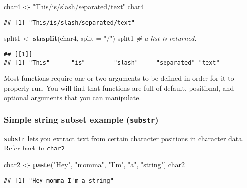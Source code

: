 \documentclass[]{article}
\newenvironment{Shaded}{\begin{snugshade}}{\end{snugshade}}
\newcommand{\KeywordTok}[1]{\textcolor[rgb]{0.13,0.29,0.53}{\textbf{#1}}}
\newcommand{\DataTypeTok}[1]{\textcolor[rgb]{0.13,0.29,0.53}{#1}}
\newcommand{\StringTok}[1]{\textcolor[rgb]{0.31,0.60,0.02}{#1}}
\newcommand{\CommentTok}[1]{\textcolor[rgb]{0.56,0.35,0.01}{\textit{#1}}}
\newcommand{\NormalTok}[1]{#1}
\begin{document}
\begin{Shaded}
\begin{Highlighting}[]
\NormalTok{char4 <-}\StringTok{ "This/is/slash/separated/text"}
\NormalTok{char4}
\end{Highlighting}
\end{Shaded}

\begin{verbatim}
## [1] "This/is/slash/separated/text"
\end{verbatim}

\begin{Shaded}
\begin{Highlighting}[]
\NormalTok{split1 <-}\StringTok{ }\KeywordTok{strsplit}\NormalTok{(char4, }\DataTypeTok{split =} \StringTok{"/"}\NormalTok{)}
\NormalTok{split1 }\CommentTok{# a list is returned. }
\end{Highlighting}
\end{Shaded}

\begin{verbatim}
## [[1]]
## [1] "This"      "is"        "slash"     "separated" "text"
\end{verbatim}

Most functions require one or two arguments to be defined in order for
it to properly run. You will find that functions are full of default,
positional, and optional arguments that you can manipulate.

\subsubsection{\texorpdfstring{Simple string subset example
(\texttt{substr})}{Simple string subset example (substr)}}\label{simple-string-subset-example-substr}

\texttt{substr} lets you extract text from certain character positions
in character data. Refer back to \texttt{char2}

\begin{Shaded}
\begin{Highlighting}[]
\NormalTok{char2 <-}\StringTok{ }\KeywordTok{paste}\NormalTok{(}\StringTok{"Hey"}\NormalTok{, }\StringTok{"momma"}\NormalTok{, }\StringTok{"I'm"}\NormalTok{, }\StringTok{"a"}\NormalTok{, }\StringTok{"string"}\NormalTok{)}
\NormalTok{char2}
\end{Highlighting}
\end{Shaded}

\begin{verbatim}
## [1] "Hey momma I'm a string"
\end{verbatim}
\end{document}
